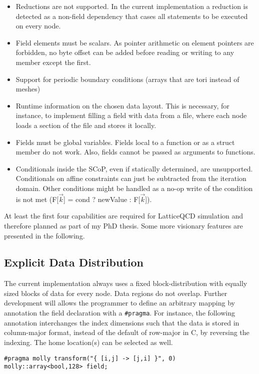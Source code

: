 \documentclass{sigplanconf}
\begin{document}
\begin{itemize}
\item Reductions are not supported. In the current implementation a reduction is detected as a non-field dependency that cases all statements to be executed on every node.
\item Field elements must be scalars. As pointer arithmetic on element pointers are forbidden, no byte offset can be added before reading or writing to any member except the first.
\item Support for periodic boundary conditions (arrays that are tori instead of meshes)
\item Runtime information on the chosen data layout. This is necessary, for instance, to implement filling a field with data from a file, where each node loads a section of the file and stores it locally.
\item Fields must be global variables. Fields local to a function or as a struct member do not work. Also, fields cannot be passed as arguments to functions.
\item Conditionals inside the SCoP, even if statically determined, are unsupported. Conditionals on affine constraints can just be subtracted from the iteration domain. Other conditions might be handled as a no-op write of the condition is not met (F[$\vec k$] = cond ? newValue : F[$\vec k$]).
\end{itemize}

At least the first four capabilities are required for LatticeQCD simulation and therefore planned as part of my PhD thesis. Some more visionary features are presented in the following.


\subsection{Explicit Data Distribution}

The current implementation always uses a fixed block-distribution with equally sized blocks of data for every node. Data regions do not overlap. Further development will allows the programmer to define an arbitrary mapping by annotation the field declaration with a \texttt{\#pragma}. For instance, the following annotation interchanges the index dimensions such that the data is stored in column-major format, instead of the default of row-major in C, by reversing the indexing. The home location(s) can be selected as well.

\begin{verbatim}
#pragma molly transform("{ [i,j] -> [j,i] }", 0)
molly::array<bool,128> field;
\end{verbatim}
\end{document}
